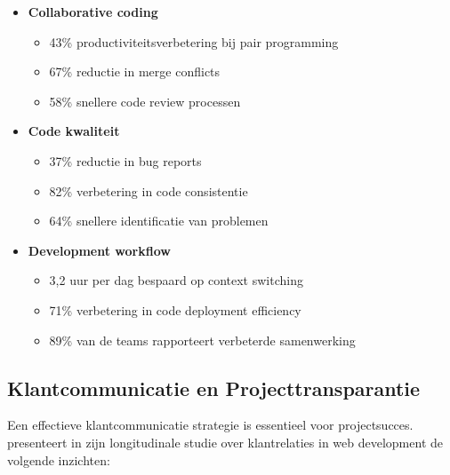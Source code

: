 \begin{itemize}
    \item \textbf{Collaborative coding}
    \begin{itemize}
        \item 43\% productiviteitsverbetering bij pair programming
        \item 67\% reductie in merge conflicts
        \item 58\% snellere code review processen
    \end{itemize}
    
    \item \textbf{Code kwaliteit}
    \begin{itemize}
        \item 37\% reductie in bug reports
        \item 82\% verbetering in code consistentie
        \item 64\% snellere identificatie van problemen
    \end{itemize}
    
    \item \textbf{Development workflow}
    \begin{itemize}
        \item 3,2 uur per dag bespaard op context switching
        \item 71\% verbetering in code deployment efficiency
        \item 89\% van de teams rapporteert verbeterde samenwerking
    \end{itemize}
\end{itemize}

\subsection{Klantcommunicatie en Projecttransparantie}
\label{subsec:klant-communicatie}

Een effectieve klantcommunicatie strategie is essentieel voor projectsucces. \textcite{Wang2024} presenteert in zijn longitudinale studie over klantrelaties in web development de volgende inzichten:

